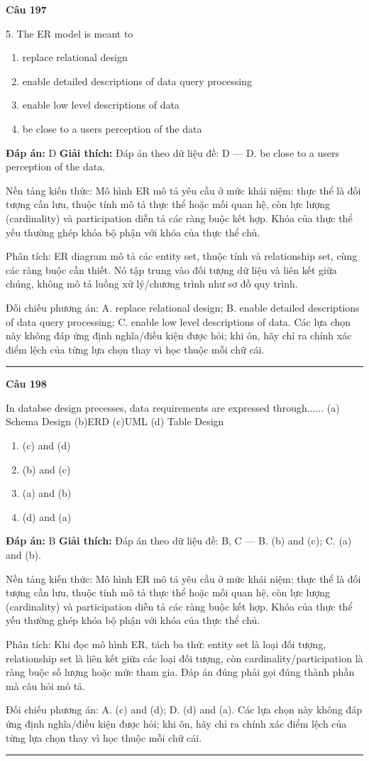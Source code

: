 \documentclass[11pt,a4paper]{article}
\newenvironment{question}[1]{%
  \par\vspace{1em}\noindent\textbf{\large Câu #1}\par\vspace{0.4em}
}{%
  \par\vspace{1em}\hrule\vspace{0.6em}
}
\newenvironment{choices}{%
  \begin{enumerate}[label=\textbf{\Alph*.},leftmargin=2.2em,itemsep=2pt,topsep=3pt]
}{%
  \end{enumerate}
}
\newcommand{\choice}{\item}
\begin{document}
\begin{question}{197}
5. The ER model is meant to
\begin{choices}
\choice replace relational design
\choice enable detailed descriptions of data query processing
\choice enable low level descriptions of data
\choice be close to a users perception of the data
\end{choices}
\textbf{Đáp án:} D
\textbf{Giải thích:} Đáp án theo dữ liệu đề: D — D. be close to a users perception of the data.

Nền tảng kiến thức: Mô hình ER mô tả yêu cầu ở mức khái niệm: thực thể là đối tượng cần lưu, thuộc tính mô tả thực thể hoặc mối quan hệ, còn lực lượng (cardinality) và participation diễn tả các ràng buộc kết hợp. Khóa của thực thể yếu thường ghép khóa bộ phận với khóa của thực thể chủ.

Phân tích: ER diagram mô tả các entity set, thuộc tính và relationship set, cùng các ràng buộc cần thiết. Nó tập trung vào đối tượng dữ liệu và liên kết giữa chúng, không mô tả luồng xử lý/chương trình như sơ đồ quy trình.

Đối chiếu phương án: A. replace relational design; B. enable detailed descriptions of data query processing; C. enable low level descriptions of data. Các lựa chọn này không đáp ứng định nghĩa/điều kiện được hỏi; khi ôn, hãy chỉ ra chính xác điểm lệch của từng lựa chọn thay vì học thuộc mỗi chữ cái.
\end{question}

\begin{question}{198}
In databse design precesses, data requirements are expressed through......
(a) Schema Design
(b)ERD
(c)UML
(d) Table Design
\begin{choices}
\choice (c) and (d)
\choice (b) and (c)
\choice (a) and (b)
\choice (d) and (a)
\end{choices}
\textbf{Đáp án:} B
\textbf{Giải thích:} Đáp án theo dữ liệu đề: B, C — B. (b) and (c); C. (a) and (b).

Nền tảng kiến thức: Mô hình ER mô tả yêu cầu ở mức khái niệm: thực thể là đối tượng cần lưu, thuộc tính mô tả thực thể hoặc mối quan hệ, còn lực lượng (cardinality) và participation diễn tả các ràng buộc kết hợp. Khóa của thực thể yếu thường ghép khóa bộ phận với khóa của thực thể chủ.

Phân tích: Khi đọc mô hình ER, tách ba thứ: entity set là loại đối tượng, relationship set là liên kết giữa các loại đối tượng, còn cardinality/participation là ràng buộc số lượng hoặc mức tham gia. Đáp án đúng phải gọi đúng thành phần mà câu hỏi mô tả.

Đối chiếu phương án: A. (c) and (d); D. (d) and (a). Các lựa chọn này không đáp ứng định nghĩa/điều kiện được hỏi; khi ôn, hãy chỉ ra chính xác điểm lệch của từng lựa chọn thay vì học thuộc mỗi chữ cái.
\end{question}
\end{document}
